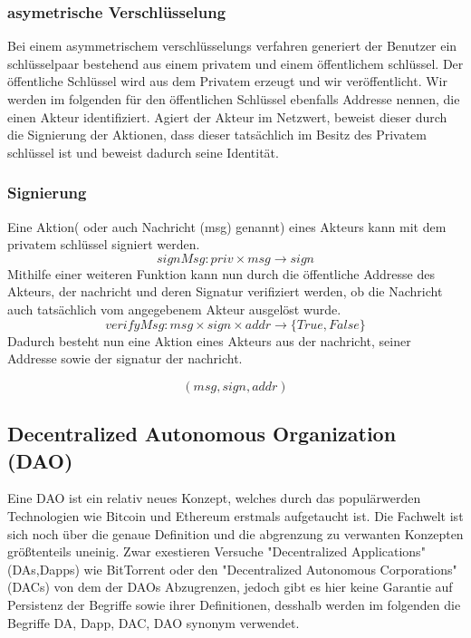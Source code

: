 \documentclass[]{article}
\begin{document}

\subsubsection*{asymetrische Verschlüsselung}
Bei einem asymmetrischem verschlüsselungs verfahren generiert der Benutzer ein schlüsselpaar bestehend aus einem privatem und einem öffentlichem schlüssel. Der öffentliche Schlüssel wird aus dem Privatem erzeugt und wir veröffentlicht. Wir werden im folgenden für den öffentlichen Schlüssel ebenfalls Addresse nennen, die einen Akteur identifiziert. Agiert der Akteur im Netzwert, beweist dieser durch die Signierung der Aktionen, dass dieser tatsächlich im Besitz des Privatem schlüssel ist und beweist dadurch seine Identität.

\subsubsection*{Signierung}

Eine Aktion( oder auch Nachricht (msg) genannt) eines Akteurs kann mit dem privatem schlüssel signiert werden.
\[ signMsg: priv \times msg \rightarrow sign \] 
Mithilfe einer weiteren Funktion kann nun durch die öffentliche Addresse des Akteurs, der nachricht und deren Signatur verifiziert werden, ob die Nachricht auch tatsächlich vom angegebenem Akteur ausgelöst wurde.
\[ verifyMsg: msg \times sign \times addr \rightarrow \{ True, False \} \] 
Dadurch besteht nun eine Aktion eines Akteurs aus der nachricht, seiner Addresse sowie der signatur der nachricht.

\[ (msg, sign, addr) \]

\subsection{Decentralized Autonomous Organization (DAO)}
Eine DAO ist ein relativ neues Konzept, welches durch das populärwerden Technologien wie Bitcoin und Ethereum erstmals aufgetaucht ist. Die Fachwelt ist sich noch über die genaue Definition und die abgrenzung zu verwanten Konzepten größtenteils uneinig. Zwar exestieren Versuche "Decentralized Applications" (DAs,Dapps) wie BitTorrent oder den "Decentralized Autonomous Corporations" (DACs) von dem der DAOs Abzugrenzen, jedoch gibt es hier keine Garantie auf Persistenz der Begriffe sowie ihrer Definitionen, desshalb werden im folgenden die Begriffe DA, Dapp, DAC, DAO synonym verwendet.
\end{document}
